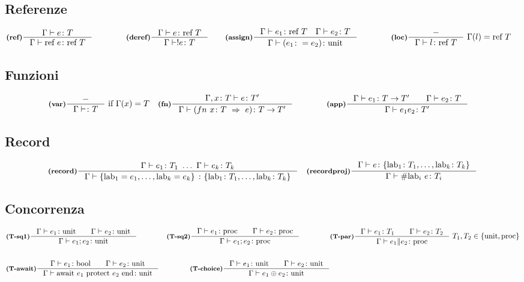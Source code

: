 \documentclass[a4paper, 10pt]{article}
\newcommand{\bool}{\textup{bool}}
\newcommand{\infer}[4]{\inference[\textbf{#1}]{#2}{#3}#4 }
\begin{document}
\begin{minipage}{.45\linewidth}
\begin{flushleft}
\subsection*{Referenze}
	\begin{align*}
		&\infer{(ref)}{\Gamma\vdash e \colon T}{\Gamma\vdash \text{ref } e\colon \text{ref } T}{}  \qquad  \qquad
		\infer{(deref)}{\Gamma\vdash e \colon\text{ref } T}{\Gamma\vdash !e \colon T}{} \qquad
		\infer{(assign)}{\Gamma\vdash e_1\colon \text{ref } T\quad \Gamma\vdash e_2\colon T }{\Gamma\vdash (e_1 \colon = e_2)\colon \text{unit}}{}\qquad  \qquad
		\infer{(loc)}{-}{\Gamma\vdash l\colon \text{ref } T}{\ \Gamma (l) = \text{ref } T}
	\end{align*}
\subsection*{Funzioni}
	\begin{align*}
		&\infer{(var)}{-}{\Gamma \vdash \colon T}{\ \textup{if}\ \Gamma (x) = T} 
		&\infer{(fn)}{\Gamma , x \colon T \vdash e\colon T'}{\Gamma\vdash (fn\ x\colon T\ \Rightarrow\ e )\colon T\rightarrow T'}{} \qquad\qquad
		&\infer{(app)}{\Gamma \vdash e_1 \colon T \rightarrow T'\qquad \Gamma\vdash e_2\colon T}{\Gamma\vdash e_1 e_2\colon T'}{} 
	\end{align*}
\subsection*{Record}
	\begin{align*}
		&\infer{(record)}{\Gamma \vdash e_1 \colon T_1\ \dots\ \Gamma \vdash e_k \colon T_k}{\Gamma \vdash \{\text{lab}_1 = e_1, \dots, \text{lab}_k = e_k \}\ \colon \{\text{lab}_1 \colon T_1,\dots, \text{lab}_k\colon T_k  \} }{}
		&\infer{(recordproj)}{\Gamma\vdash e\colon \{\text{lab}_1\colon T_1,\dots, \text{lab}_k\colon T_k \} }{\Gamma\vdash \# \text{lab}_i\ e \colon T_i}{}
	\end{align*}
\subsection*{Concorrenza}
	\begin{align*}
		&\infer{(T-sq1)}{\Gamma\vdash e_1\colon\textup{unit}\qquad \Gamma\vdash e_2\colon\textup{unit}}{\Gamma\vdash e_1;e_2\colon \textup{unit}}{}
		&\infer{(T-sq2)}{\Gamma\vdash e_1\colon\textup{proc}\qquad \Gamma\vdash e_2\colon\textup{proc}}{\Gamma\vdash e_1;e_2\colon \textup{proc}}{} \qquad\qquad
		&\infer{(T-par)}{\Gamma\vdash e_1\colon T_1\qquad \Gamma\vdash e_2\colon T_2}{\Gamma\vdash e_1 \| e_2\colon \textup{proc}}{\ T_1, T_2 \in \{\textup{unit}, \textup{proc}\}} \\ \\
		&\infer{(T-await)}{\Gamma\vdash e_1 \colon \bool\qquad \Gamma\vdash e_2\colon \textup{unit}}{
			\Gamma\vdash \textup{await}\ e_1\ \textup{protect}\ e_2\ \textup{end}\colon \textup{unit} }{} 
		&\infer{(T-choice)}{\Gamma\vdash e_1 \colon \textup{unit}\qquad \Gamma\vdash e_2\colon \textup{unit}}{\Gamma\vdash e_1 \oplus e_2\colon \textup{unit}}{}
	\end{align*}
	\end{flushleft}
\end{minipage}
\end{document}
